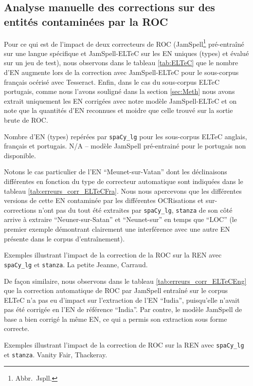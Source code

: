 \subsection{Analyse manuelle des corrections sur des entités contaminées par la ROC}
Pour ce qui est de l'impact de deux correcteurs de ROC (JamSpell\footnote{Abbr.\ Jspll.} pré-entraîné sur une langue spécifique et JamSpell-ELTeC  sur les EN uniques (types) et évalué sur un jeu de test), nous observons dans le tableau \ref{tab:ELTeC} que le nombre d'EN augmente lors de la correction avec JamSpell-ELTeC pour le sous-corpus français océrisé avec Tesseract. 
Enfin, dans le cas du sous-corpus ELTeC portugais, comme nous l'avons souligné dans la section \ref{sec:Meth} nous avons extrait uniquement les EN corrigées avec notre modèle JamSpell-ELTeC et on note que la quantités d'EN reconnues et moidre que celle trouvé sur la sortie brute de ROC.
\begin{table}[h!]
    \centering
    \small
    
    \caption{Nombre d'EN (types) repérées par \texttt{spaCy\_lg} pour les sous-corpus ELTeC anglais, français et portugais. N/A -- modèle JamSpell pré-entrainé pour le portugais non disponible.}
    \label{tab:ELTeC}
\end{table}

Notons le cas particulier de l'EN ``Meunet-sur-Vatan'' dont les déclinaisons différentes en fonction du type de correcteur automatique sont indiquées dans le tableau \ref{tab:erreurs_corr_ELTeCFra}. Nous nous apercevons que les différentes versions de cette EN contaminée par les différentes OCRisations et sur-corrections n'ont pas du tout été extraites par \texttt{spaCy\_lg}, \texttt{stanza} de son côté arrive à extraire ``Neuner-sur-Satan'' et ``Neunet-sur'' en temps que ``LOC'' (le premier exemple démontrant clairement une interférence avec une autre EN présente dans le corpus d'entraînement).

\begin{table}[h!]
    \small
    \centering
   
     \caption{Exemples illustrant l'impact de la correction de la ROC sur la REN avec \texttt{spaCy\_lg} et \texttt{stanza}. {\normalfont La petite Jeanne}, Carraud.}
    \label{tab:erreurs_corr_ELTeCFra}
\end{table}

De façon similaire, nous observons dans le tableau \ref{tab:erreurs_corr_ELTeCEng} que la correction automatique de ROC par JamSpell entraîné sur le corpus ELTeC n'a pas eu d'impact sur l'extraction de l'EN ``Iudia'', puisqu'elle n'avait pas été corrigée en l'EN de référence ``India''. Par contre, le modèle JamSpell de base a bien corrigé la même EN, ce qui a permis son extraction sous forme correcte.
\begin{table}[h!]
\small
    \centering
   
    \caption{Exemples illustrant l'impact de la correction de ROC sur la REN avec \texttt{spaCy\_lg} et \texttt{stanza}. {\normalfont Vanity Fair}, Thackeray.}
    \label{tab:erreurs_corr_ELTeCEng}
\end{table}

